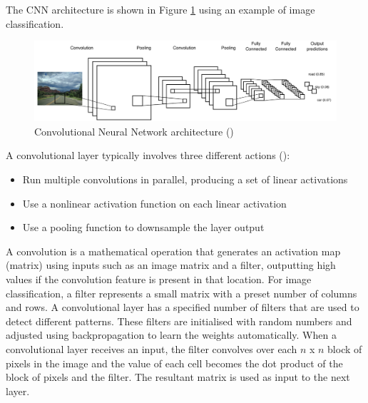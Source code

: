The \acrshort{CNN} architecture is shown in Figure \ref{fig:cnn_1} using an example of image classification.

\begin{figure}[ht!]
\centering
\includegraphics[width=1\textwidth]{media/literature/machine_learning/ml_cnn_1.png}
\caption[Diagram of a convolutional neural network architecture]{Convolutional Neural Network architecture (\cite{lopez_deep_2017})}
\label{fig:cnn_1}
\end{figure}

A convolutional layer typically involves three different actions (\cite{goodfellow_deep_learning_2016}):
\begin{itemize}
    \item Run multiple convolutions in parallel, producing a set of linear activations
    \item Use a nonlinear activation function on each linear activation
    \item Use a pooling function to downsample the layer output
\end{itemize}


A convolution is a mathematical operation that generates an activation map (matrix) using inputs such as an image matrix and a filter, outputting high values if the convolution feature is present in that location. For image classification, a filter represents a small matrix with a preset number of columns and rows.
A convolutional layer has a specified number of filters that are used to detect different patterns. These filters are initialised with random numbers and adjusted using backpropagation to learn the weights automatically.
When a convolutional layer receives an input, the filter convolves over each $n$ x $n$ block of pixels in the image and the value of each cell becomes the dot product of the block of pixels and the filter. The resultant matrix is used as input to the next layer.

